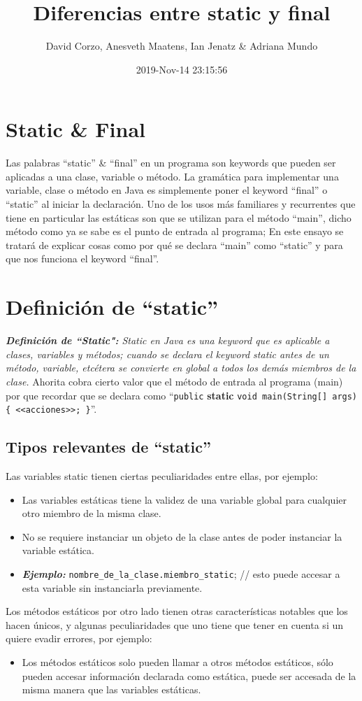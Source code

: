 \documentclass{article}
\title{Diferencias entre static y final}
\author{David Corzo, Anesveth Maatens, Ian Jenatz \& Adriana Mundo}
\date{2019-Nov-14 23:15:56}
\begin{document}
\maketitle

\section{Static \& Final}
Las palabras ``static'' \& ``final'' en un programa son keywords que pueden ser aplicadas a una clase, variable o método. La gramática para implementar una variable, clase o método en Java es simplemente poner el keyword ``final'' o ``static'' al iniciar la declaración. Uno de los usos más familiares y recurrentes que tiene en particular las estáticas son que se utilizan para el método ``main'', dicho método como ya se sabe es el punto de entrada al programa; En este ensayo se tratará de explicar cosas como por qué se declara ``main'' como ``static'' y para que nos funciona el keyword ``final''.

\section{Definición de ``static''}
\emph{\textbf{Definición de ``Static":} Static en Java es una keyword que es aplicable a clases, variables y métodos; cuando se declara el keyword static antes de un método, variable, etcétera se convierte en global a todos los demás miembros de la clase.} Ahorita cobra cierto valor que el método de entrada al programa (main) por que recordar que se declara como ``\verb|public| \textbf{static} \verb|void main(String[] args) { <<acciones>>; }|''.

\subsection{Tipos relevantes de ``static''}
Las variables static tienen ciertas peculiaridades entre ellas, por ejemplo:
    \begin{itemize}
        \item Las variables estáticas tiene la validez de una variable global para cualquier otro miembro de la misma clase.
        \item No se requiere instanciar un objeto de la clase antes de poder instanciar la variable estática.
        \item \emph{\textbf{Ejemplo: }}\verb|nombre_de_la_clase.miembro_static|; // esto puede accesar a esta variable sin instanciarla previamente.  
    \end{itemize}
Los métodos estáticos por otro lado tienen otras características notables que los hacen únicos, y algunas peculiaridades que uno tiene que tener en cuenta si un quiere evadir errores, por ejemplo:
    \begin{itemize}
        \item Los métodos estáticos solo pueden llamar a otros métodos estáticos, sólo pueden accesar información declarada como estática, puede ser accesada de la misma manera que las variables estáticas.
    \end{itemize}
\end{document}
